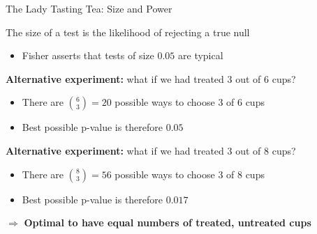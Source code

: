\documentclass[10pt,xcolor=table,ignorenonframetext,handout,aspectratio=169]{beamer}
\newlength{\wideitemsep}
\let\olditem\item
\renewcommand{\item}{\setlength{\itemsep}{\wideitemsep}\olditem}
\begin{document}
\begin{frame}{The Lady Tasting Tea:  Size and Power}

\medskip
The size of a test is the likelihood of rejecting a true null

\medskip
\begin{itemize}
	
	\item Fisher asserts that tests of size $0.05$ are typical
	
\end{itemize}

\pause
\medskip
\textbf{Alternative experiment:}  what if we had treated 3 out of 6 cups?

\medskip
\begin{itemize}
	
	\item There are ${6 \choose 3} = 20$ possible ways to choose 3 of 6 cups
	
	\item Best possible p-value is therefore $0.05$
	
\end{itemize}

\pause
\medskip
\textbf{Alternative experiment:}  what if we had treated 3 out of 8 cups?

\medskip
\begin{itemize}
	
	\item There are ${8 \choose 3} = 56$ possible ways to choose 3 of 8 cups
	
	\item Best possible p-value is therefore $0.017$
	
\end{itemize}

\pause
\medskip
$\Rightarrow$ \textbf{Optimal to have equal numbers of treated, untreated cups}

\end{frame}


\end{document}
